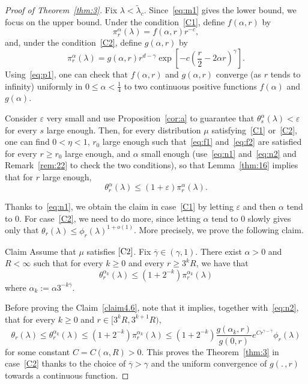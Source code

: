 \documentclass[10pt]{amsart}
\theoremstyle{definition}\newtheorem{defi}[theo]{Definition}\newtheorem{rema}[theo]{Remark}\newtheorem{exam}[theo]{Example}\newtheorem{exem}[theo]{Example}\newtheorem{nota}[theo]{Notation}
\newcommand{\ep}{\varepsilon}
\begin{document}
\begin{proof}[Proof of Theorem~\ref{thm:3}]
Fix $\lambda<\widetilde\lambda_c$.
Since~\eqref{eq:m1} gives the lower bound, we focus on the upper bound. Under the condition~\eqref{C1}, define $f(\alpha,r)$ by
\begin{equation}\label{eq:n1}
\pi_r^\alpha(\lambda)=f(\alpha,r) r^{-c},
\end{equation}
and, under the condition~\eqref{C2}, define $g(\alpha,r)$ by
\begin{equation}\label{eq:n2}
\pi_r^\alpha(\lambda)=g(\alpha,r) r^{d-\gamma} \exp\left[-c \left(\frac r 2-{2\alpha} r\right)^\gamma\right]. 
\end{equation}
Using~\eqref{eq:p1}, one can check that $f(\alpha,r)$ and $g(\alpha,r)$ converge (as $r$ tends to infinity) uniformly in $0\le \alpha<\tfrac14$ to two continuous positive functions $f(\alpha)$ and $g(\alpha)$.

Consider $\ep$ very small and use Proposition~\ref{cor:a} to guarantee that $\theta_{s}^\alpha(\lambda)<\ep$ for every $s$ large enough. Then, for every distribution $\mu$ satisfying~\eqref{C1}  or~\eqref{C2}, one can find $0<\eta<1$, $r_0$ large enough such that~\eqref{eq:f1} and~\eqref{eq:f2} are satisfied for every $r\ge r_0$ large enough, and $\alpha$ small enough (use~\eqref{eq:n1} and~\eqref{eq:n2} and Remark~\ref{rem:22} to check the two conditions), so that Lemma~\ref{thm:16} implies that for $r$ large enough,
\begin{equation}
\theta_r^\alpha(\lambda)\le (1+\ep)\pi_r^\alpha(\lambda)\label{eq:bn}
.
\end{equation}

Thanks to~\eqref{eq:n1}, we obtain the claim in case~\eqref{C1} by letting $\ep$ and then $\alpha$ tend to 0. For case~\eqref{C2}, we need to do more, since letting $\alpha$ tend to 0 slowly gives only that $\theta_r(\lambda)\le \phi_r(\lambda)^{1+o(1)}$. More precisely, we prove the following claim.

\begin{enonce}[plain]{Claim}\label{claim4.6}
Assume that $\mu$ satisfies $\eqref{C2}$. Fix $\overline \gamma\in(\gamma,1)$. There exist $\alpha>0$ and $R<\infty$ such that for every $k\ge0$ and every $r\ge 3^kR$, we have that
\begin{equation}\label{eq:b2}
\theta_{r}^{\alpha_k}(\lambda)\le (1+2^{-k})\pi_r^{\alpha_k}(\lambda)
\end{equation}
where $\alpha_k:= \alpha 3^{-k \overline\gamma}$.
\end{enonce}


Before proving the Claim~\ref{claim4.6}, note that it implies, together with~\eqref{eq:n2}, that for every $k\ge0$ and $r\in [3^k R,3^{k+1}R)$,
\[
\theta_r(\lambda)\le\theta_{r}^{\alpha_k}(\lambda)\le (1+2^{-k})\pi_r^{\alpha_k}(\lambda)\le (1+2^{-k}) \frac{g(\alpha_k,r)}{g(0,r)}e^{Cr^{\gamma-\overline\gamma}} \phi_r(\lambda)
\]
for some constant $C=C(\alpha,R)>0$. This proves the Theorem~\ref{thm:3} in case~\eqref{C2} thanks to the choice of $\overline\gamma>\gamma$ and the uniform convergence of $g(.\,,r)$ towards a continuous function.
\end{proof}
\end{document}
